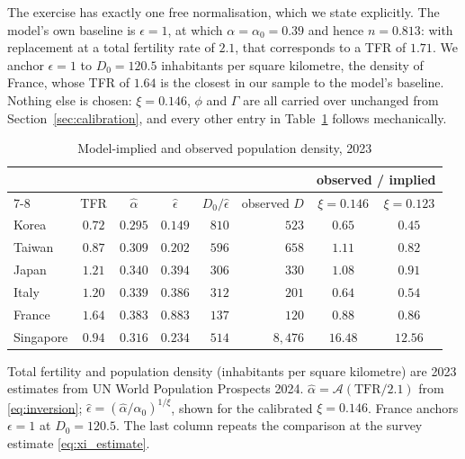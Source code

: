 \documentclass[11pt]{article}
\begin{document}
The exercise has exactly one free normalisation, which we state explicitly. The model's own baseline
is $\epsilon=1$, at which $\alpha=\alpha_0=0.39$ and hence $n=0.813$: with replacement at a total
fertility rate of $2.1$, that corresponds to a TFR of $1.71$. We anchor $\epsilon=1$ to
$D_0=120.5$ inhabitants per square kilometre, the density of France, whose TFR of $1.64$ is the
closest in our sample to the model's baseline. Nothing else is chosen: $\xi=0.146$, $\phi$ and
$\Gamma$ are all carried over unchanged from Section~\ref{sec:calibration}, and every other entry in
Table~\ref{tab:crosscountry} follows mechanically.

\begin{table}[h!]\centering
\begin{threeparttable}
\caption{Model-implied and observed population density, 2023}
\label{tab:crosscountry}
\begin{tabular}{lcccrrcc}
\toprule
& & & & & & \multicolumn{2}{c}{observed / implied}\\
\cmidrule(lr){7-8}
& TFR & $\hat\alpha$ & $\hat\epsilon$ & $D_0/\hat\epsilon$ & observed $D$ & $\xi=0.146$ & $\xi=0.123$\\
\midrule
Korea       & $0.72$ & $0.295$ & $0.149$ & $810$ & $523$  & $0.65$ & $0.45$\\
Taiwan      & $0.87$ & $0.309$ & $0.202$ & $596$ & $658$  & $1.11$ & $0.82$\\
Japan       & $1.21$ & $0.340$ & $0.394$ & $306$ & $330$  & $1.08$ & $0.91$\\
Italy       & $1.20$ & $0.339$ & $0.386$ & $312$ & $201$  & $0.64$ & $0.54$\\
France      & $1.64$ & $0.383$ & $0.883$ & $137$ & $120$  & $0.88$ & $0.86$\\
Singapore   & $0.94$ & $0.316$ & $0.234$ & $514$ & $8{,}476$ & $16.48$ & $12.56$\\
\bottomrule
\end{tabular}
\begin{tablenotes}\footnotesize
\item Total fertility and population density (inhabitants per square kilometre) are 2023 estimates
from UN World Population Prospects 2024. $\hat\alpha=\mathcal{A}(\text{TFR}/2.1)$ from
\eqref{eq:inversion}; $\hat\epsilon=(\hat\alpha/\alpha_0)^{1/\xi}$, shown for the calibrated
$\xi=0.146$. France anchors $\epsilon=1$ at $D_0=120.5$. The last column repeats the comparison at
the survey estimate \eqref{eq:xi_estimate}.
\end{tablenotes}
\end{threeparttable}
\end{table}
\end{document}
